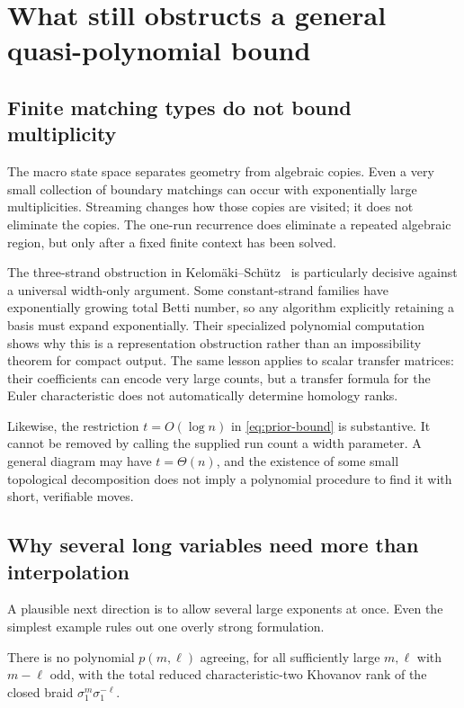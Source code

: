\section{What still obstructs a general quasi-polynomial bound}\label{sec:barriers}

\subsection{Finite matching types do not bound multiplicity}

The macro state space separates geometry from algebraic copies.
Even a very small collection of boundary matchings can occur with
exponentially large multiplicities. Streaming changes how those copies
are visited; it does not eliminate the copies. The one-run recurrence
does eliminate a repeated algebraic region, but only after a fixed
finite context has been solved.

The three-strand obstruction in Kelom\"aki--Sch\"utz~\cite{ks26}
is particularly decisive against a universal width-only argument.
Some constant-strand families have exponentially growing total Betti
number, so any algorithm explicitly retaining a basis must expand
exponentially. Their specialized polynomial computation shows why this
is a representation obstruction rather than an impossibility theorem
for compact output.
The same lesson applies to scalar transfer matrices: their coefficients
can encode very large counts, but a transfer formula for the Euler
characteristic does not automatically determine homology ranks.

Likewise, the restriction \(t=O(\log n)\) in
\eqref{eq:prior-bound} is substantive. It cannot be removed by calling
the supplied run count a width parameter. A general diagram may have
\(t=\Theta(n)\), and the existence of some small topological
decomposition does not imply a polynomial procedure to find it with
short, verifiable moves.

\subsection{Why several long variables need more than interpolation}

A plausible next direction is to allow several large exponents at
once. Even the simplest example rules out one overly strong formulation.

\begin{proposition}
\label{prop:chambers}
There is no polynomial \(p(m,\ell)\) agreeing, for all sufficiently
large \(m,\ell\) with \(m-\ell\) odd, with the total reduced
characteristic-two Khovanov rank of the closed braid
\(\sigma_1^m\sigma_1^{-\ell}\).
\end{proposition}

